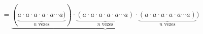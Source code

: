\documentclass[preview]{standalone}
\begin{document}
\begin{align*}
=\underbrace{(\underbrace{a \cdot a \cdot a \cdot a \cdot a \cdots a)}_{n \text{ vezes}})\cdot\underbrace{(a \cdot a \cdot a \cdot a \cdot a \cdots a)}_{n \text{ vezes}}\cdot\underbrace{(a \cdot a \cdot a \cdot a \cdot a \cdots a)}_{n \text{ vezes}})}
\end{align*}
\end{document}

